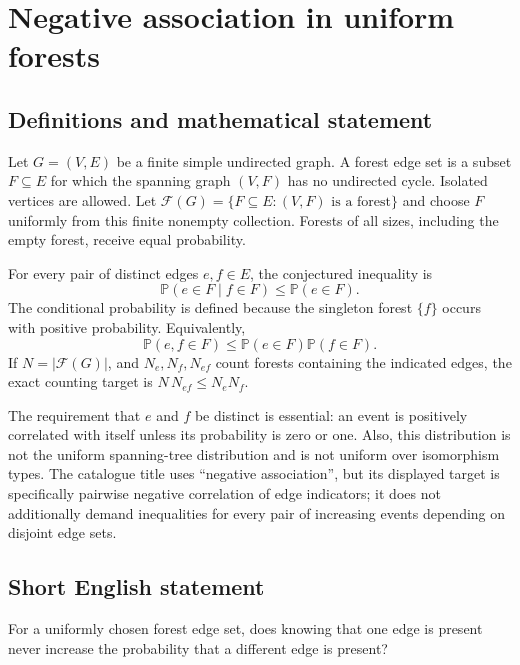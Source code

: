 \documentclass[11pt,a4paper]{article}
\begin{document}
\section*{Negative association in uniform forests}\label{statement}

\subsection{Definitions and mathematical statement}
Let $G=(V,E)$ be a finite simple undirected graph. A forest edge set
is a subset $F\subseteq E$ for which the spanning graph $(V,F)$ has
no undirected cycle. Isolated vertices are allowed. Let
$\mathcal F(G)=\{F\subseteq E:(V,F)\text{ is a forest}\}$ and choose
$F$ uniformly from this finite nonempty collection. Forests of all
sizes, including the empty forest, receive equal probability.

For every pair of distinct edges $e,f\in E$, the conjectured inequality
is
\[
                  \mathbb P(e\in F\mid f\in F)
                              \le\mathbb P(e\in F).
\]
The conditional probability is defined because the singleton forest
$\{f\}$ occurs with positive probability. Equivalently,
\[
            \mathbb P(e,f\in F)\le
                         \mathbb P(e\in F)\mathbb P(f\in F).
\]
If $N=|\mathcal F(G)|$, and $N_e,N_f,N_{ef}$ count forests containing
the indicated edges, the exact counting target is
$N\,N_{ef}\le N_eN_f$.

The requirement that $e$ and $f$ be distinct is essential: an event is
positively correlated with itself unless its probability is zero or
one. Also, this distribution is not the uniform spanning-tree
distribution and is not uniform over isomorphism types. The catalogue
title uses ``negative association'', but its displayed target is
specifically pairwise negative correlation of edge indicators; it
does not additionally demand inequalities for every pair of increasing
events depending on disjoint edge sets.
\subsection{Short English statement}
For a uniformly chosen forest edge set, does knowing that one edge is present never increase the probability that a different edge is present?
\end{document}
